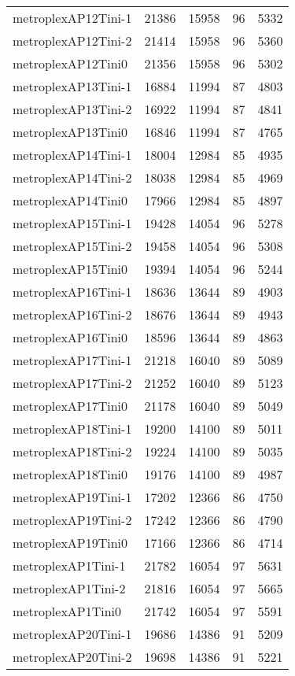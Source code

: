 \begin{tabular}{lrrrr}
metroplexAP12Tini-1 & 21386 & 15958 & 96 & 5332 \\
metroplexAP12Tini-2 & 21414 & 15958 & 96 & 5360 \\
metroplexAP12Tini0 & 21356 & 15958 & 96 & 5302 \\
metroplexAP13Tini-1 & 16884 & 11994 & 87 & 4803 \\
metroplexAP13Tini-2 & 16922 & 11994 & 87 & 4841 \\
metroplexAP13Tini0 & 16846 & 11994 & 87 & 4765 \\
metroplexAP14Tini-1 & 18004 & 12984 & 85 & 4935 \\
metroplexAP14Tini-2 & 18038 & 12984 & 85 & 4969 \\
metroplexAP14Tini0 & 17966 & 12984 & 85 & 4897 \\
metroplexAP15Tini-1 & 19428 & 14054 & 96 & 5278 \\
metroplexAP15Tini-2 & 19458 & 14054 & 96 & 5308 \\
metroplexAP15Tini0 & 19394 & 14054 & 96 & 5244 \\
metroplexAP16Tini-1 & 18636 & 13644 & 89 & 4903 \\
metroplexAP16Tini-2 & 18676 & 13644 & 89 & 4943 \\
metroplexAP16Tini0 & 18596 & 13644 & 89 & 4863 \\
metroplexAP17Tini-1 & 21218 & 16040 & 89 & 5089 \\
metroplexAP17Tini-2 & 21252 & 16040 & 89 & 5123 \\
metroplexAP17Tini0 & 21178 & 16040 & 89 & 5049 \\
metroplexAP18Tini-1 & 19200 & 14100 & 89 & 5011 \\
metroplexAP18Tini-2 & 19224 & 14100 & 89 & 5035 \\
metroplexAP18Tini0 & 19176 & 14100 & 89 & 4987 \\
metroplexAP19Tini-1 & 17202 & 12366 & 86 & 4750 \\
metroplexAP19Tini-2 & 17242 & 12366 & 86 & 4790 \\
metroplexAP19Tini0 & 17166 & 12366 & 86 & 4714 \\
metroplexAP1Tini-1 & 21782 & 16054 & 97 & 5631 \\
metroplexAP1Tini-2 & 21816 & 16054 & 97 & 5665 \\
metroplexAP1Tini0 & 21742 & 16054 & 97 & 5591 \\
metroplexAP20Tini-1 & 19686 & 14386 & 91 & 5209 \\
metroplexAP20Tini-2 & 19698 & 14386 & 91 & 5221 \\

\end{tabular}
